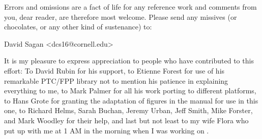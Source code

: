 Errors and omissions are a fact of life for any reference work and
comments from you, dear reader, are therefore most welcome. Please
send any missives (or chocolates, or any other kind of sustenance) to:
\begin{example}
  David Sagan <dcs16@cornell.edu>
\end{example}

It is my pleasure to express appreciation to people who have
contributed to this effort: To David Rubin for his support, to Etienne
Forest for use of his remarkable PTC/FPP library not to mention his
patience in explaining everything to me, to Mark Palmer for all his
work porting \bmad to different platforms, to Hans Grote for granting
the adaptation of figures in the \mad manual for use in this one, to
Richard Helms, Sarah Buchan, Jeremy Urban, Jeff Smith, Mike Forster,
and Mark Woodley for their help, and last but not least to my wife
Flora who put up with me at 1 AM in the morning when I was working on
\bmad.

